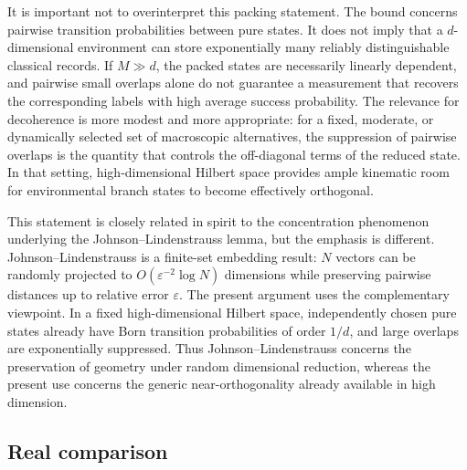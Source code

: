 \documentclass[aps,pra,reprint,superscriptaddress,nofootinbib,longbibliography]{revtex4-2}
\newcommand{\eps}{\varepsilon}
\begin{document}
It is important not to overinterpret this packing statement.  The bound concerns
pairwise transition probabilities between pure states. It does not imply that a
$d$-dimensional environment can store exponentially many reliably distinguishable
classical records. If $M\gg d$, the packed states are necessarily linearly
dependent, and pairwise small overlaps alone do not guarantee a measurement that
recovers the corresponding labels with high average success probability. The
relevance for decoherence is more modest and more appropriate: for a fixed,
moderate, or dynamically selected set of macroscopic alternatives, the
suppression of pairwise overlaps is the quantity that controls the off-diagonal
terms of the reduced state. In that setting, high-dimensional Hilbert space
provides ample kinematic room for environmental branch states to become
effectively orthogonal.

This statement is closely related in spirit to the concentration phenomenon
underlying the Johnson--Lindenstrauss lemma, but the emphasis is different.
Johnson--Lindenstrauss is a finite-set embedding result: $N$ vectors can be
randomly projected to $O(\eps^{-2}\log N)$ dimensions while preserving pairwise
distances up to relative error $\eps$.  The present argument uses the
complementary viewpoint.  In a fixed high-dimensional Hilbert space,
independently chosen pure states already have Born transition probabilities of
order $1/d$, and large overlaps are exponentially suppressed.  Thus
Johnson--Lindenstrauss concerns the preservation of geometry under random
dimensional reduction, whereas the present use concerns the generic
near-orthogonality already available in high dimension.

\subsection*{Real comparison}
\label{subsec:real-case}
\end{document}
